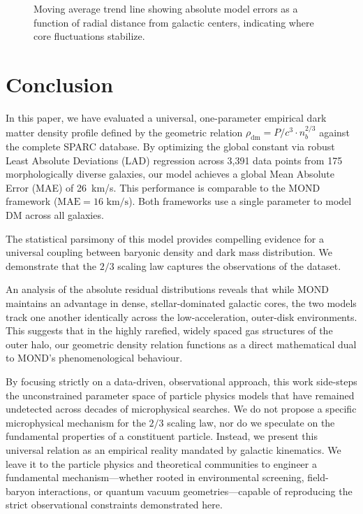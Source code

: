 \documentclass[fleqn,usenatbib]{mnras}
\begin{document}
\begin{figure}
\centering
{}
\caption{Moving average trend line showing absolute model errors as a function of radial distance from galactic centers, indicating where core fluctuations stabilize.}
\label{fig:radial_error}
\end{figure}

\section{Conclusion} \label{sec:conclusion}

In this paper, we have evaluated a universal, one-parameter empirical dark matter density profile defined by the geometric relation $\rho_{\text{dm}} = P/c^3 \cdot n_b^{2/3}$ against the complete SPARC database. By optimizing the global constant via robust Least Absolute Deviations (LAD) regression across 3,391 data points from 175 morphologically diverse galaxies, our model achieves a global Mean Absolute Error (MAE) of 26~km/s. This performance is comparable to the MOND framework ($\text{MAE} = 16\text{ km/s}$). Both frameworks use a single parameter to model DM across all galaxies.

The statistical parsimony of this model provides compelling evidence for a universal coupling between baryonic density and dark mass distribution. We demonstrate that the $2/3$ scaling law captures the observations of the dataset.  

An analysis of the absolute residual distributions reveals that while MOND maintains an advantage in dense, stellar-dominated galactic cores, the two models track one another identically across the low-acceleration, outer-disk environments. This suggests that in the highly rarefied, widely spaced gas structures of the outer halo, our geometric density relation functions as a direct mathematical dual to MOND's phenomenological behaviour.

By focusing strictly on a data-driven, observational approach, this work side-steps the unconstrained parameter space of particle physics models that have remained undetected across decades of microphysical searches. We do not propose a specific microphysical mechanism for the $2/3$ scaling law, nor do we speculate on the fundamental properties of a constituent particle. Instead, we present this universal relation as an empirical reality mandated by galactic kinematics. We leave it to the particle physics and theoretical communities to engineer a fundamental mechanism---whether rooted in environmental screening, field-baryon interactions, or quantum vacuum geometries---capable of reproducing the strict observational constraints demonstrated here.
\end{document}

